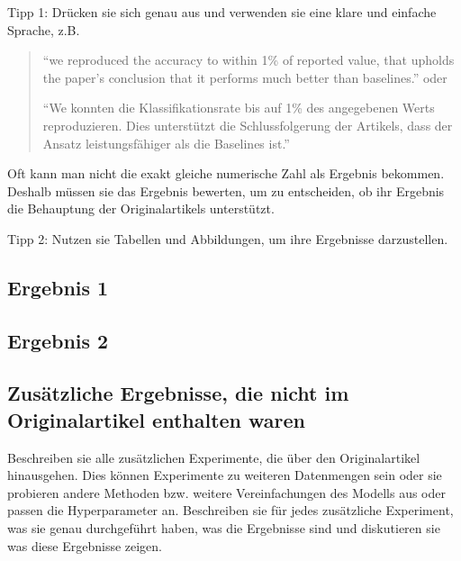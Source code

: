 \documentclass[DIV=13,fontsize=11pt]{scrartcl}
\begin{document}

Tipp 1: Drücken sie sich genau aus und verwenden sie eine klare und einfache Sprache, z.B.
\begin{quote}
    ``we reproduced the accuracy to within 1\% of reported value, that upholds the paper's conclusion that it performs much better than baselines.'' oder

    ``We konnten die Klassifikationsrate bis auf 1\% des angegebenen Werts reproduzieren. Dies unterstützt die Schlussfolgerung der Artikels, dass der Ansatz leistungsfähiger als die Baselines ist.''
\end{quote}
Oft kann man nicht die exakt gleiche numerische Zahl als Ergebnis bekommen. Deshalb müssen sie das Ergebnis bewerten, um zu entscheiden, ob ihr Ergebnis die Behauptung der Originalartikels unterstützt.

Tipp 2: Nutzen sie Tabellen und Abbildungen, um ihre Ergebnisse darzustellen.


\subsection{Ergebnis 1}

\subsection{Ergebnis 2}

\subsection{Zusätzliche Ergebnisse, die nicht im Originalartikel enthalten waren}
Beschreiben sie alle zusätzlichen Experimente, die über den Originalartikel hinausgehen.
Dies können Experimente zu weiteren Datenmengen sein oder sie probieren andere Methoden bzw. weitere Vereinfachungen des Modells aus oder passen die Hyperparameter an.
Beschreiben sie für jedes zusätzliche Experiment, was sie genau durchgeführt haben, was die Ergebnisse sind und diskutieren sie was diese Ergebnisse zeigen.
\end{document}
